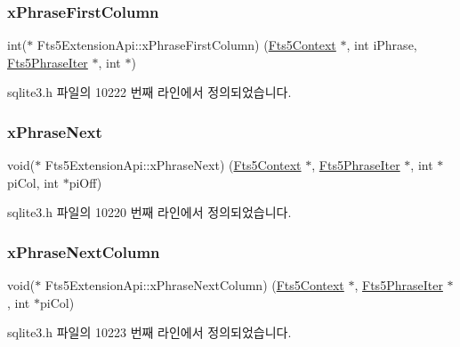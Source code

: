 \subsubsection{\texorpdfstring{x\+Phrase\+First\+Column}{xPhraseFirstColumn}}
{\footnotesize\ttfamily int($\ast$ Fts5\+Extension\+Api\+::x\+Phrase\+First\+Column) (\hyperlink{sqlite3_8h_a97821b95ebebd43db901977ffd5b26bc}{Fts5\+Context} $\ast$, int i\+Phrase, \hyperlink{struct_fts5_phrase_iter}{Fts5\+Phrase\+Iter} $\ast$, int $\ast$)}



sqlite3.\+h 파일의 10222 번째 라인에서 정의되었습니다.

\mbox{\label{struct_fts5_extension_api_ac46faf7ccccf6a02454069b296dc1877}} 
\subsubsection{\texorpdfstring{x\+Phrase\+Next}{xPhraseNext}}
{\footnotesize\ttfamily void($\ast$ Fts5\+Extension\+Api\+::x\+Phrase\+Next) (\hyperlink{sqlite3_8h_a97821b95ebebd43db901977ffd5b26bc}{Fts5\+Context} $\ast$, \hyperlink{struct_fts5_phrase_iter}{Fts5\+Phrase\+Iter} $\ast$, int $\ast$pi\+Col, int $\ast$pi\+Off)}



sqlite3.\+h 파일의 10220 번째 라인에서 정의되었습니다.

\mbox{\label{struct_fts5_extension_api_ae699a91c958cbac92a2ae8000670ef89}} 
\subsubsection{\texorpdfstring{x\+Phrase\+Next\+Column}{xPhraseNextColumn}}
{\footnotesize\ttfamily void($\ast$ Fts5\+Extension\+Api\+::x\+Phrase\+Next\+Column) (\hyperlink{sqlite3_8h_a97821b95ebebd43db901977ffd5b26bc}{Fts5\+Context} $\ast$, \hyperlink{struct_fts5_phrase_iter}{Fts5\+Phrase\+Iter} $\ast$, int $\ast$pi\+Col)}



sqlite3.\+h 파일의 10223 번째 라인에서 정의되었습니다.

